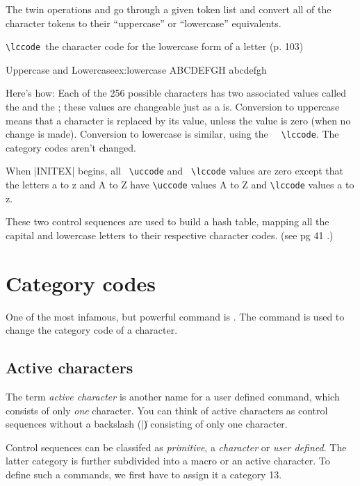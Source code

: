 The twin operations  and 
go through a given token list and convert all of the character tokens to their
\enquote{uppercase}  or \enquote{lowercase} equivalents.

\verb*+\lccode +the character code for the lowercase form of a letter (p. 103)

\begin{texexample}{Uppercase and Lowercase}{ex:lowercase} 
\uppercase{abcdefgh} 
\lowercase{ABCDEFGH}
\end{texexample}

Here's how: Each of the 256 possible characters has two associated values called the \cmd{\uccode} and the \cmd{\lccode}; these values are
changeable just as a \cmd{\catcode} is. Conversion to uppercase means that a character
is replaced by its \cmd{\uccode} value, unless the \cmd{\uccode} value is zero (when no change
is made). Conversion to lowercase is similar, using the
\verb+  \lccode+. The category codes
aren't changed. 

When |INITEX| begins, all \verb+ \uccode+ and \verb+ \lccode+ values are zero except
that the letters a to z and A to Z have \verb+\uccode+ values A to Z and \verb+\lccode+ values a to z.

These two control sequences are used to build a hash table, mapping all the capital and lowercase letters to their respective character codes.
(see pg 41 \texbook.)

\section{Category codes}

One of the most infamous, but powerful \tex command is . The command is used to change the category code of a character.

\subsection{Active characters}

The term \emph{active character} is another name for a user defined command, which consists of only \emph{one} character. You can think of active characters as control sequences without a backslash (|\|) consisting of only one character. 

Control sequences can be classifed as \emph{primitive}, a \emph{character} or \emph{user defined}. The latter category is further subdivided into a macro or an active character. To define such a commands, we first have to assign it a category 13. 

